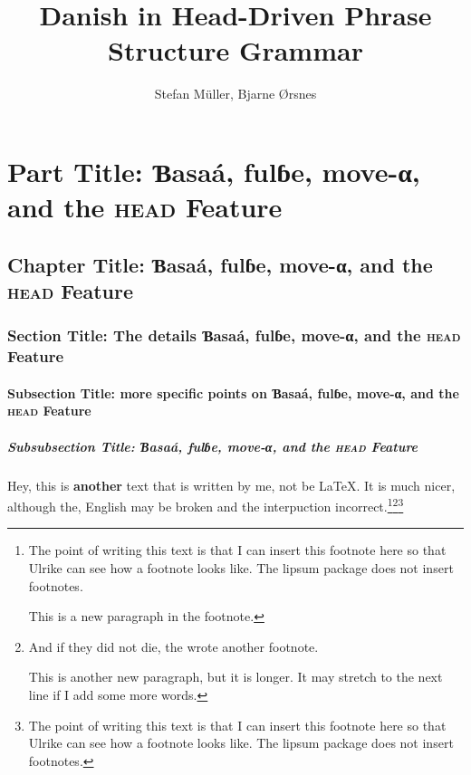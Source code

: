 \documentclass[ number=45
			   ,series=eotms
			   ,output=printondemand %
			  ]{langsci}
\title{Danish in \newlineCover Head-Driven \newlineCover Phrase Structure \newlineCover  Grammar  }
\author{Stefan Müller, \newlineCover Bjarne Ørsnes}
\begin{document}
               
         
                                        
                                
\maketitle                

\tableofcontents      
        
\part{Part Title: Ɓasaá, fulɓe, move-α, and the \textrm{\textsc{head}} Feature}	               
\chapter{Chapter Title: Ɓasaá, fulɓe, move-α, and the \textrm{\textsc{head}} Feature}
\section{Section Title: The details Ɓasaá, fulɓe, move-α, and the \textrm{\textsc{head}} Feature}
\subsection{Subsection Title: more specific points on Ɓasaá, fulɓe, move-α, and the \textrm{\textsc{head}} Feature}
\subsubsection{Subsubsection Title: Ɓasaá, fulɓe, move-α, and the \textrm{\textsc{head}} Feature}       
                                                     
   
Hey, this is \textbf{another} text that is written by me, not be \LaTeX{}. It is much nicer, although the,
English may be broken and the interpuction incorrect.\footnote{%
  The point of writing this text is that I can insert this footnote here so that Ulrike can see how
  a footnote looks like. The lipsum package does not insert footnotes.
 
  This is a new paragraph in the footnote.
}\footnote{%
  And if they did not die, the wrote another footnote.

  This is another new paragraph, but it is longer. It may stretch to the next line if I add some
  more words.
}\footnote{%
  The point of writing this text is that I can insert this footnote here so that Ulrike can see how
  a footnote looks like. The lipsum package does not insert footnotes.
}
\end{document}
